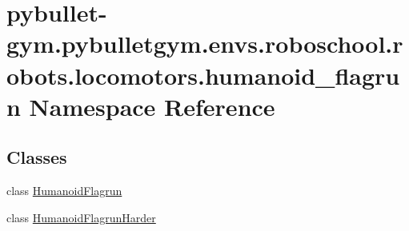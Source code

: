 \hypertarget{namespacepybullet-gym_1_1pybulletgym_1_1envs_1_1roboschool_1_1robots_1_1locomotors_1_1humanoid__flagrun}{}\section{pybullet-\/gym.pybulletgym.\+envs.\+roboschool.\+robots.\+locomotors.\+humanoid\+\_\+flagrun Namespace Reference}
\label{namespacepybullet-gym_1_1pybulletgym_1_1envs_1_1roboschool_1_1robots_1_1locomotors_1_1humanoid__flagrun}
\subsection*{Classes}
\begin{DoxyCompactItemize}
\item 
class \hyperlink{classpybullet-gym_1_1pybulletgym_1_1envs_1_1roboschool_1_1robots_1_1locomotors_1_1humanoid__flagrun_1_1_humanoid_flagrun}{Humanoid\+Flagrun}
\item 
class \hyperlink{classpybullet-gym_1_1pybulletgym_1_1envs_1_1roboschool_1_1robots_1_1locomotors_1_1humanoid__flagrun_1_1_humanoid_flagrun_harder}{Humanoid\+Flagrun\+Harder}
\end{DoxyCompactItemize}
